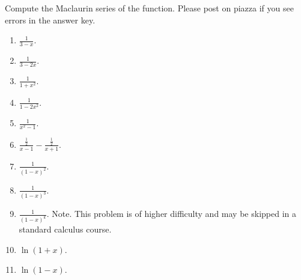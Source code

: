 Compute the Maclaurin series of the function. Please post on piazza if you see errors in the answer key.
\begin{multicols}{2}
\begin{enumerate}
\item $\displaystyle \frac{1}{3-x}$.

\item $\displaystyle \frac{1}{3-2x}$.


\item $\displaystyle \frac{1}{1+x^2}$.


\item $\displaystyle \frac{1}{1-2x^2}$.

\item $\displaystyle \frac{1}{x^2-1}$. \label{problemMaclaurin(1/(x^2-1))}

\item $\displaystyle\frac{\frac12}{x-1}-\frac{\frac12}{x+1}$.

\item $\displaystyle \frac{1}{(1-x)^2}$.

\item $\displaystyle \frac{1}{(1-x)^3}$.


\item \label{problemMaclaurin 1/(1-x)^k} $\displaystyle \frac{1}{(1-x)^k}$. {Note. This problem is of higher difficulty and may be skipped in a standard calculus course.} 


\item $\displaystyle\ln (1+x)$.

\item $\ln (1-x)$.


\end{enumerate}
\end{multicols}
